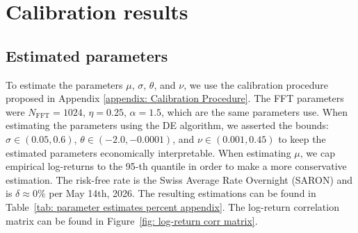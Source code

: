\endgroup

\section{Calibration results}
\label{appendix: calibration results}
\subsection{Estimated parameters}
To estimate the parameters $\mu$, $\sigma$, $\theta$, and $\nu$, we use the calibration procedure proposed in Appendix \ref{appendix: Calibration Procedure}. The FFT parameters were $N_{\text{FFT}}=1024$, $\eta=0.25$, $\alpha=1.5$, which are the same parameters \textcite{carr1999option} use. When estimating the parameters using the DE algorithm, we asserted the bounds: $\sigma \in (0.05,0.6)$, $\theta \in (-2.0, -0.0001)$, and $\nu \in (0.001, 0.45)$ to keep the estimated parameters economically interpretable. When estimating $\mu$, we cap empirical log-returns to the 95-th quantile in order to make a more conservative estimation. The risk-free rate is the Swiss Average Rate Overnight (SARON) and is $\delta\approx 0\%$ per May 14th, 2026. The resulting estimations can be found in Table~\ref{tab: parameter estimates percent appendix}. The log-return correlation matrix can be found in Figure~\ref{fig: log-return corr matrix}.

